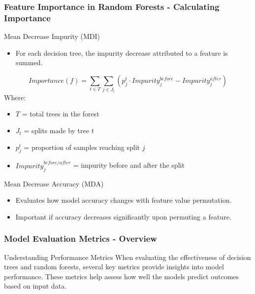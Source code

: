 \documentclass[aspectratio=169]{beamer}
\begin{document}
\begin{frame}[fragile]
    \frametitle{Feature Importance in Random Forests - Calculating Importance}
    \begin{block}{Mean Decrease Impurity (MDI)}
        \begin{itemize}
            \item For each decision tree, the impurity decrease attributed to a feature is summed.
        \end{itemize}
        \begin{equation}
            Importance(f) = \sum_{t \in T} \sum_{j \in J_t} (p_j^t \cdot Impurity_{j}^{before} - Impurity_{j}^{after})
        \end{equation}
        Where:
        \begin{itemize}
            \item \( T \) = total trees in the forest
            \item \( J_t \) = splits made by tree \( t \)
            \item \( p_j^t \) = proportion of samples reaching split \( j \)
            \item \( Impurity_{j}^{before/after} \) = impurity before and after the split
        \end{itemize}
    \end{block}
    
    \begin{block}{Mean Decrease Accuracy (MDA)}
        \begin{itemize}
            \item Evaluates how model accuracy changes with feature value permutation.
            \item Important if accuracy decreases significantly upon permuting a feature.
        \end{itemize}
    \end{block}
\end{frame}

\begin{frame}[fragile]
    \frametitle{Model Evaluation Metrics - Overview}
    \begin{block}{Understanding Performance Metrics}
        When evaluating the effectiveness of decision trees and random forests, several key metrics provide insights into model performance. These metrics help assess how well the models predict outcomes based on input data.
    \end{block}
\end{frame}
\end{document}
